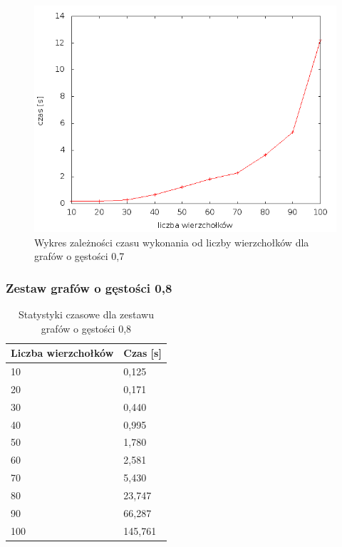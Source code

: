 \documentclass[12pt, a4paper]{article}
\begin{document}
\begin{figure}[h]
    \begin{center}
	\includegraphics[scale=0.5]{results/img/den/den_07.png}
	\caption{Wykres zależności czasu wykonania od liczby wierzchołków dla grafów o gęstości 0,7}
    \end{center}
\end{figure}

\subsubsection*{Zestaw grafów o gęstości 0,8}
\begin{table}[H]
\caption{Statystyki czasowe dla zestawu grafów o gęstości 0,8}
\begin{center}
    \begin{tabular}{|l|l|}
    \hline
    Liczba wierzchołków & Czas [s] \\ \hline
    10 & 0,125 \\ \hline
    20 & 0,171 \\ \hline
    30 & 0,440 \\ \hline
    40 & 0,995 \\ \hline
    50 & 1,780 \\ \hline
    60 & 2,581 \\ \hline
    70 & 5,430 \\ \hline
    80 & 23,747 \\ \hline
    90 & 66,287 \\ \hline
    100 & 145,761 \\ \hline
    \end{tabular}
\end{center}
\end{table}
\end{document}
